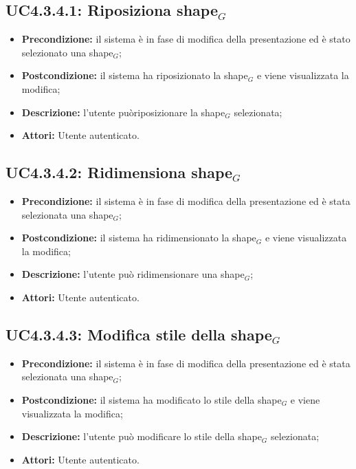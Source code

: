 \subsection{ UC4.3.4.1: Riposiziona shape$_G$}

\begin{itemize}
	\item \textbf{Precondizione:} 	il sistema è in fase di modifica della presentazione ed è stato selezionato una shape$_G$;
	\item \textbf{Postcondizione:} il sistema ha riposizionato la shape$_G$ e viene visualizzata la modifica;
	\item \textbf{Descrizione:} l'utente puòriposizionare la shape$_G$ selezionata;
	\item \textbf{Attori:} Utente autenticato.
\end{itemize}
\subsection{ UC4.3.4.2: Ridimensiona shape$_G$}

\begin{itemize}
	\item \textbf{Precondizione:} il sistema è in fase di modifica della presentazione ed è stata selezionata una shape$_G$;
	\item \textbf{Postcondizione:} il sistema ha ridimensionato la shape$_G$ e viene visualizzata la modifica;
	\item \textbf{Descrizione:} l'utente può ridimensionare una shape$_G$;
	\item \textbf{Attori:} Utente autenticato.
\end{itemize}
\subsection{ UC4.3.4.3: Modifica stile della shape$_G$}

\begin{itemize}
	\item \textbf{Precondizione:} il sistema è in fase di modifica della presentazione ed è stata selezionata una shape$_G$;
	\item \textbf{Postcondizione:} il sistema ha modificato lo stile della shape$_G$ e viene visualizzata la modifica;
	\item \textbf{Descrizione:} l'utente può modificare lo stile della shape$_G$ selezionata;
	\item \textbf{Attori:} Utente autenticato.
\end{itemize}

